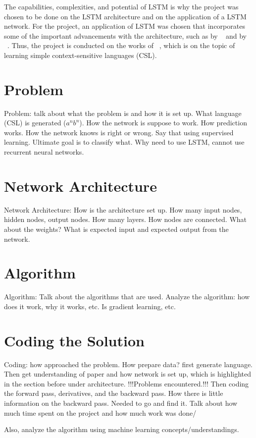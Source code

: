 \documentclass[11pt,letterpaper]{article}
\begin{document}
The capabilities, complexities, and potential of LSTM is why the project was chosen to be done on the LSTM architecture and on the application of a LSTM network. For the project, an application of LSTM was chosen that incorporates some of the important advancements with the architecture, such as by ~\cite{Gers:99} and by ~\cite{Gers:02}. Thus, the project is conducted on the works of ~\cite{Gers:01}, which is on the topic of learning simple context-sensitive languages (CSL).

\section{Problem}
Problem: talk about what the problem is and how it is set up. What language (CSL) is generated ($a^n b^n$). How the network is suppose to work. How prediction works. How the network knows is right or wrong. Say that using supervised learning. Ultimate goal is to classify what. Why need to use LSTM, cannot use recurrent neural networks.

\section{Network Architecture}
Network Architecture: How is the architecture set up. How many input nodes, hidden nodes, output nodes. How many layers. How nodes are connected. What about the weights? What is expected input and expected output from the network.

\section{Algorithm}
Algorithm: Talk about the algorithms that are used. Analyze the algorithm: how does it work, why it works, etc. Is gradient learning, etc.

\section{Coding the Solution}
Coding: how approached the problem. How prepare data? first generate language. Then get understanding of paper and how network is set up, which is highlighted in the section before under architecture. !!!Problems encountered.!!! Then coding the forward pass, derivatives, and the backward pass. How there is little information on the backward pass. Needed to go and find it. Talk about how much time spent on the project and how much work was done/

Also, analyze the algorithm using machine learning concepts/understandings.
\end{document}

